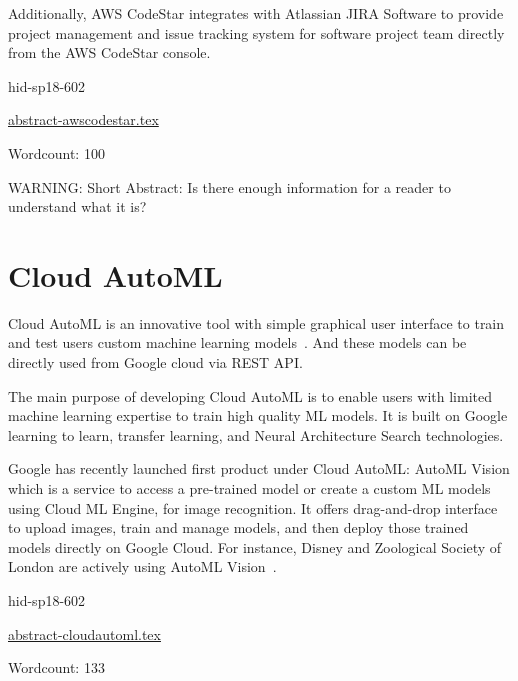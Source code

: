 Additionally, AWS CodeStar integrates with Atlassian JIRA Software to 
provide project management and issue tracking system for software project 
team directly from the AWS CodeStar console\cite{hid-sp18-602-www-awscodestar-blog}.



\begin{IU}

hid-sp18-602

\href{https://github.com/cloudmesh-community/hid-sp18-602/blob/master//technology/abstract-awscodestar.tex}{abstract-awscodestar.tex}

 

Wordcount: 100

WARNING: Short Abstract: Is there enough information for a reader to understand what it is?

\end{IU}

\section{Cloud AutoML}

Cloud AutoML is an innovative tool with simple graphical user interface to train
and test users custom machine learning models~\cite{hid-sp18-602-www-cloudautoml-main}.
And these models can be directly used from Google cloud via REST API. 

The main purpose of developing Cloud AutoML is to enable users with limited 
machine learning expertise to train high quality ML models. It is built on Google
learning to learn, transfer learning, and Neural Architecture Search 
technologies.

Google has recently launched first product under Cloud AutoML: AutoML Vision 
which is a service to access a pre-trained model or create a custom ML models using
Cloud ML Engine, for image recognition. It offers drag-and-drop interface to 
upload images, train and manage models, and then deploy those trained models 
directly on Google Cloud. For instance, Disney and Zoological Society of London are
actively using AutoML Vision~\cite{hid-sp18-602-wwww-cloudautoml-blog}.



\begin{IU}

hid-sp18-602

\href{https://github.com/cloudmesh-community/hid-sp18-602/blob/master//technology/abstract-cloudautoml.tex}{abstract-cloudautoml.tex}

 

Wordcount: 133

\end{IU}

